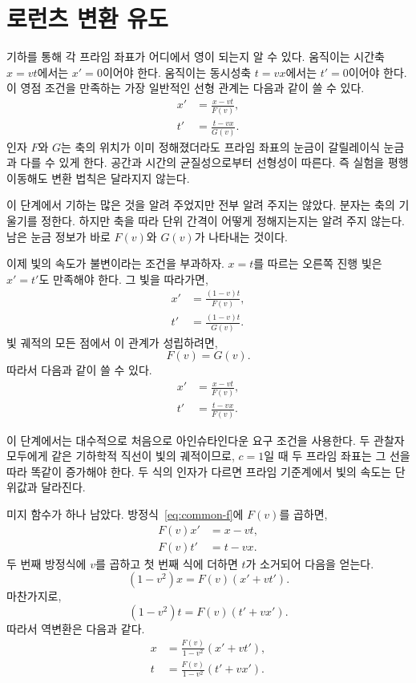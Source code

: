 \section{로런츠 변환 유도}

기하를 통해 각 프라임 좌표가 어디에서 영이 되는지 알 수 있다. 움직이는 시간축 \(x=vt\)에서는 \(x'=0\)이어야 한다. 움직이는 동시성축 \(t=vx\)에서는 \(t'=0\)이어야 한다. 이 영점 조건을 만족하는 가장 일반적인 선형 관계는 다음과 같이 쓸 수 있다.
\begin{align}
x'&=\frac{x-vt}{F(v)},\\
t'&=\frac{t-vx}{G(v)}.
\label{eq:fg-ansatz}
\end{align}
인자 \(F\)와 \(G\)는 축의 위치가 이미 정해졌더라도 프라임 좌표의 눈금이 갈릴레이식 눈금과 다를 수 있게 한다. 공간과 시간의 균질성으로부터 선형성이 따른다. 즉 실험을 평행 이동해도 변환 법칙은 달라지지 않는다.

이 단계에서 기하는 많은 것을 알려 주었지만 전부 알려 주지는 않았다. 분자는 축의 기울기를 정한다. 하지만 축을 따라 단위 간격이 어떻게 정해지는지는 알려 주지 않는다. 남은 눈금 정보가 바로 \(F(v)\)와 \(G(v)\)가 나타내는 것이다.

이제 빛의 속도가 불변이라는 조건을 부과하자. \(x=t\)를 따르는 오른쪽 진행 빛은 \(x'=t'\)도 만족해야 한다. 그 빛을 따라가면,
\begin{align}
x'&=\frac{(1-v)t}{F(v)},\\
t'&=\frac{(1-v)t}{G(v)}.
\end{align}
빛 궤적의 모든 점에서 이 관계가 성립하려면,
\begin{equation}
F(v)=G(v).
\end{equation}
따라서 다음과 같이 쓸 수 있다.
\begin{align}
x'&=\frac{x-vt}{F(v)},\\
t'&=\frac{t-vx}{F(v)}.
\label{eq:common-f}
\end{align}

이 단계에서는 대수적으로 처음으로 아인슈타인다운 요구 조건을 사용한다. 두 관찰자 모두에게 같은 기하학적 직선이 빛의 궤적이므로, \(c=1\)일 때 두 프라임 좌표는 그 선을 따라 똑같이 증가해야 한다. 두 식의 인자가 다르면 프라임 기준계에서 빛의 속도는 단위값과 달라진다.

미지 함수가 하나 남았다. 방정식~\eqref{eq:common-f}에 \(F(v)\)를 곱하면,
\begin{align}
F(v)x'&=x-vt,\\
F(v)t'&=t-vx.
\end{align}
두 번째 방정식에 \(v\)를 곱하고 첫 번째 식에 더하면 \(t\)가 소거되어 다음을 얻는다.
\begin{equation}
(1-v^2)x=F(v)(x'+vt').
\end{equation}
마찬가지로,
\begin{equation}
(1-v^2)t=F(v)(t'+vx').
\end{equation}
따라서 역변환은 다음과 같다.
\begin{align}
x&=\frac{F(v)}{1-v^2}(x'+vt'),\\
t&=\frac{F(v)}{1-v^2}(t'+vx').
\end{align}


